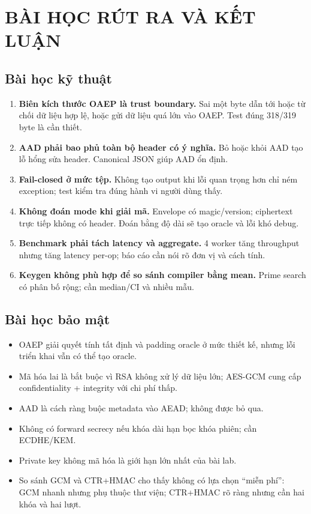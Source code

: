 \documentclass[12pt,a4paper,oneside]{report}
\let\origtexttt\texttt
\renewcommand{\texttt}[1]{\origtexttt{\seqsplit{#1}}}
\begin{document}
\chapter{BÀI HỌC RÚT RA VÀ KẾT LUẬN}


\section{Bài học kỹ thuật}


\begin{enumerate}[leftmargin=*]
\item \textbf{Biên kích thước OAEP là trust boundary.} Sai một byte dẫn tới hoặc từ chối dữ liệu hợp lệ, hoặc gửi dữ liệu quá lớn vào OAEP. Test đúng 318/319 byte là cần thiết.
\item \textbf{AAD phải bao phủ toàn bộ header có ý nghĩa.} Bỏ \texttt{payload\_len} hoặc \texttt{label} khỏi AAD tạo lỗ hổng sửa header. Canonical JSON giúp AAD ổn định.
\item \textbf{Fail-closed ở mức tệp.} Không tạo output khi lỗi quan trọng hơn chỉ ném exception; test \texttt{[[ ! -e output ]]} kiểm tra đúng hành vi người dùng thấy.
\item \textbf{Không đoán mode khi giải mã.} Envelope có magic/version; ciphertext trực tiếp không có header. Đoán bằng độ dài sẽ tạo oracle và lỗi khó debug.
\item \textbf{Benchmark phải tách latency và aggregate.} 4 worker tăng throughput nhưng tăng latency per-op; báo cáo cần nói rõ đơn vị và cách tính.
\item \textbf{Keygen không phù hợp để so sánh compiler bằng mean.} Prime search có phân bố rộng; cần median/CI và nhiều mẫu.
\end{enumerate}


\section{Bài học bảo mật}


\begin{itemize}[leftmargin=*]
\item OAEP giải quyết tính tất định và padding oracle ở mức thiết kế, nhưng lỗi triển khai vẫn có thể tạo oracle.
\item Mã hóa lai là bắt buộc vì RSA không xử lý dữ liệu lớn; AES-GCM cung cấp confidentiality + integrity với chi phí thấp.
\item AAD là cách ràng buộc metadata vào AEAD; không được bỏ qua.
\item Không có forward secrecy nếu khóa dài hạn bọc khóa phiên; cần ECDHE/KEM.
\item Private key không mã hóa là giới hạn lớn nhất của bài lab.
\item So sánh GCM và CTR+HMAC cho thấy không có lựa chọn “miễn phí”: GCM nhanh nhưng phụ thuộc thư viện; CTR+HMAC rõ ràng nhưng cần hai khóa và hai lượt.
\end{itemize}
\end{document}

